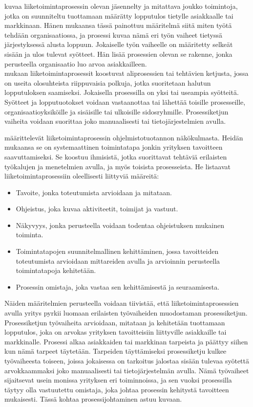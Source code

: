 \documentclass[finnish,12pt,a4paper,pdftex]{article}
\begin{document}
\cite{davenport} kuvaa liiketoimintaprosessin olevan jäsennelty ja mitattava joukko toimintoja, jotka on suunniteltu tuottamaan määrätty lopputulos tietylle asiakkaalle tai markkinaan. Hänen mukaansa tässä painottuu määritelmä siitä miten työtä tehdään organisaatiossa, ja prosessi kuvaa nämä eri työn vaiheet tietyssä järjestyksessä alusta loppuun. Jokaiselle työn vaiheelle on määritetty selkeät sisään ja ulos tulevat syötteet. Hän lisää prosessien olevan se rakenne, jonka perusteella organisaatio luo arvoa asiakkailleen.\\

\cite{weske} mukaan liiketoimintaprosessit koostuvat aliprosessien tai tehtävien ketjusta, jossa on useita olosuhteista riippuvaisia polkuja, jotka suoritetaan halutun lopputuloksen saamiseksi. Jokaisella prosessilla on yksi tai useampia syötteitä. Syötteet ja lopputuotokset voidaan vastaanottaa tai lähettää toisille prosesseille, organisaatioyksiköille ja  sisäisille tai ulkoisille sidosryhmille. Prosessiketjun vaiheita voidaan suorittaa joko manuaalisesti tai tietojärjestelmien avulla.

\cite{okaytannot} määrittelevät liiketoimintaprosessin ohjelmistotuotannon näkökulmasta. Heidän mukaansa se on systemaattinen toimintatapa jonkin yrityksen tavoitteen saavuttamiseksi. Se koostuu ihmisistä, jotka suorittavat tehtäviä erilaisten työkalujen ja menetelmien avulla, ja myös toisista prosesseista. He listaavat liiketoimintaprosessiin oleellisesti liittyviä määreitä:

\begin{itemize}
\setlength{\itemsep}{0pt}
    \item Tavoite, jonka toteutumista arvioidaan ja mitataan.
    \item Ohjeistus, joka kuvaa aktiviteetit, toimijat ja vastuut.
    \item Näkyvyys, jonka perusteella voidaan todentaa ohjeistuksen mukainen toiminta.
    \item Toimintatapojen suunnitelmallinen kehittäminen, jossa tavoitteiden toteutumista arvioidaan mittareiden avulla ja arvioinnin perusteella toimintatapoja kehitetään.
    \item Prosessin omistaja, joka vastaa sen kehittämisestä ja seuraamisesta.
\end{itemize}

Näiden määritelmien perusteella voidaan tiivistää, että liiketoimintaprosessien avulla yritys pyrkii luomaan erilaisten työvaiheiden muodostaman prosessiketjun. Prosessiketjun työvaiheita arvioidaan, mitataan ja kehitetään tuottamaan lopputulos, joka on arvokas yrityksen tavoitteisiin liittyville asiakkaille tai markkinalle. Prosessi alkaa asiakkaiden tai markkinan tarpeista ja päättyy siihen kun nämä tarpeet täytetään. Tarpeiden täyttämiseksi prosessiketju kulkee työvaiheesta toiseen, joissa jokaisessa on tarkoitus jalostaa sisään tulevaa syötettä arvokkaammaksi joko manuaalisesti tai tietojärjestelmän avulla. Nämä työvaiheet sijaitsevat usein monissa yrityksen eri toiminnoissa, ja sen vuoksi prosessilla täytyy olla vastuutettu omistaja, joka johtaa prosessin kehitystä tavoitteen mukaisesti. Tässä kohtaa prosessijohtaminen astuu kuvaan.  \\
\end{document}
